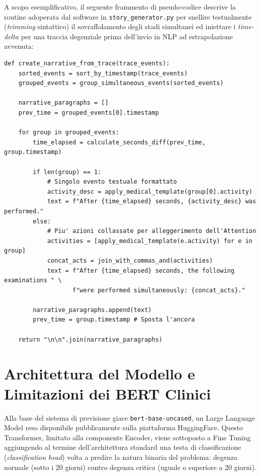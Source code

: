 \newpage
A scopo esemplificativo, il seguente frammento di pseudo-codice descrive la routine adoperata dal software in \texttt{story\_generator.py} per snellire testualmente (\textit{trimming} sintattico) il sovraffolamento degli stadi simultanei ed iniettare i \textit{time-delta} per una traccia degenziale prima dell'invio in NLP ad estrapolazione avvenuta:

\begin{verbatim}
def create_narrative_from_trace(trace_events):
    sorted_events = sort_by_timestamp(trace_events)
    grouped_events = group_simultaneous_events(sorted_events)
    
    narrative_paragraphs = []
    prev_time = grouped_events[0].timestamp
    
    for group in grouped_events:
        time_elapsed = calculate_seconds_diff(prev_time, group.timestamp)
        
        if len(group) == 1:
            # Singolo evento testuale formattato
            activity_desc = apply_medical_template(group[0].activity)
            text = f"After {time_elapsed} seconds, {activity_desc} was performed."
        else:
            # Piu' azioni collassate per alleggerimento dell'Attention
            activities = [apply_medical_template(e.activity) for e in group]
            concat_acts = join_with_commas_and(activities)
            text = f"After {time_elapsed} seconds, the following examinations " \
                   f"were performed simultaneously: {concat_acts}."
                   
        narrative_paragraphs.append(text)
        prev_time = group.timestamp # Sposta l'ancora
        
    return "\n\n".join(narrative_paragraphs)

\end{verbatim}

\section{Architettura del Modello e Limitazioni dei BERT Clinici}
Alla base del sistema di previsione giace \texttt{bert-base-uncased}, un Large Language Model reso disponibile pubblicamente sulla piattaforma HuggingFace. Questo Transformer, limitato alla componente Encoder, viene sottoposto a Fine Tuning aggiungendo al termine dell'architettura standard una testa di classificazione (\textit{classification head}) volta a predire la natura binaria del problema: degenza normale (sotto i 20 giorni) contro degenza critica (uguale o superiore a 20 giorni).

